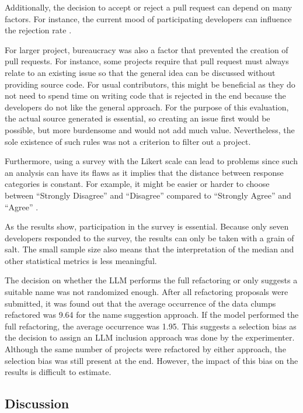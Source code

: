 Additionally, the decision to accept or reject a pull request can depend on many factors. For instance, the current mood of participating developers can influence the rejection rate \cite{detecting_emotional}.

For larger project, bureaucracy was also a factor that prevented the creation of pull requests. For instance, some projects require that pull request must always relate to an existing issue so that the general idea can be discussed without providing source code. For usual contributors, this might be beneficial as they do not need to spend time on writing code that is rejected in the end because the developers do not like the general approach. For the purpose of this evaluation, the actual source generated is essential, so creating an issue first would be possible,  but more burdensome  and would not add much value. Nevertheless, the sole existence of such rules was not a criterion to filter out a project. 

Furthermore, using a survey with the Likert scale can lead to problems since such an analysis can have its flaws as it implies that the distance between response categories is constant. For example, it might be easier or harder to choose between \enquote{Strongly Disagree} and \enquote{Disagree} compared to \enquote{Strongly Agree} and \enquote{Agree} \cite{HARPE2015836}.

As the results show, participation in the survey is essential. Because only seven developers responded to the survey, the results can only be taken with a grain of salt. The small sample size also means that the interpretation of the median and other statistical metrics is less meaningful.

The decision on whether the \ac{LLM} performs the full refactoring or only suggests a suitable name was not randomized enough. After all refactoring proposals were submitted, it was found out that the average occurrence of the data clumps refactored was 9.64 for the name suggestion approach. If the model performed the full refactoring, the average occurrence was 1.95. This suggests a selection bias as the decision to assign an \ac{LLM} inclusion approach was done by the experimenter. Although the same number of projects were refactored by either approach, the selection bias was still present at the end. However, the impact of this bias on the results is difficult to estimate. 

\subsection{Discussion}

